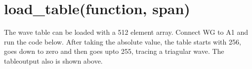 \documentclass[a4paper,12pt,english]{sphinxmanual}
\begin{document}
\begin{sphinxVerbatim}[commandchars=\\\{\}]
   

 
       

 \PYG{p}{[}\PYG{p}{]}
   
\end{sphinxVerbatim}


\section{load\_table(function, span)}
\label{\detokenize{7.1:load-table-function-span}}
The wave table can be loaded with a 512 element array. Connect WG to A1
and run the code below. After taking the absolute value, the table
starts with 256, goes down to zero and then goes upto 255, tracing a
triagular wave. The tableoutput also is shown above.

\begin{sphinxVerbatim}[commandchars=\\\{\}]
   
   
  
   
\end{sphinxVerbatim}



\renewcommand{\indexname}{Index}
\printindex
\end{document}
